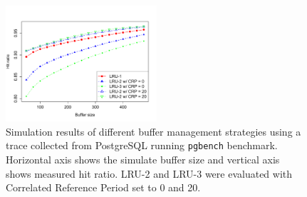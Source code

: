 \begin{figure}[t!]
    \centering
	\includegraphics[width=0.5\textwidth]{./figures/postgres.pdf}
	\caption{Simulation results of different buffer management strategies using a trace collected from PostgreSQL running \texttt{pgbench} benchmark. Horizontal axis shows the simulate buffer size and vertical axis shows measured hit ratio. LRU-2 and LRU-3 were evaluated with Correlated Reference Period set to 0 and 20.}
	\label{fig:postgres}
\end{figure}
